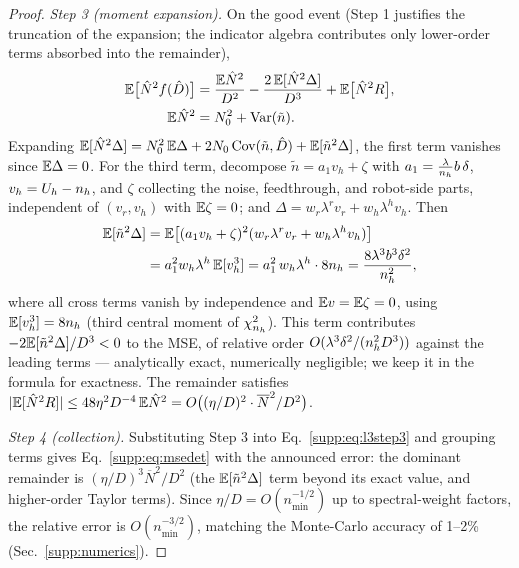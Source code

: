 \begin{proof}
\emph{Step 3 (moment expansion).}
On the good event (Step 1 justifies the truncation of the expansion; the indicator algebra contributes only lower-order terms absorbed into the remainder),
\begin{equation}
\begin{aligned}
  \mathbb{E}\big[\hat N^2 f(\hat D)\big] &= \frac{\mathbb{E}\hat N^2}{D^2} - \frac{2\,\mathbb{E}[\hat N^2 \Delta]}{D^3} + \mathbb{E}\big[\hat N^2 R\big],\\
  \mathbb{E}\hat N^2 &= N_0^2 + \mathrm{Var}(\tilde n).
\end{aligned}
  \label{supp:eq:l3step3}
\end{equation}
Expanding $\mathbb{E}[\hat N^2\Delta] = N_0^2\,\mathbb{E}\Delta + 2N_0\,\mathrm{Cov}(\tilde n, \hat D) + \mathbb{E}[\tilde n^2\Delta]$, the first term vanishes since $\mathbb{E}\Delta = 0$.
For the third term, decompose $\tilde n = a_1 v_h + \zeta$ with $a_1 = \frac{\lambda}{n_h} b\,\delta$, $v_h = U_h - n_h$, and $\zeta$ collecting the noise, feedthrough, and robot-side parts, independent of $(v_r, v_h)$ with $\mathbb{E}\zeta = 0$; and $\Delta = w_r \lambda^r v_r + w_h \lambda^h v_h$.
Then
\begin{align}
  \mathbb{E}[\tilde n^2 \Delta]
  &= \mathbb{E}\big[(a_1 v_h + \zeta)^2 (w_r \lambda^r v_r + w_h \lambda^h v_h)\big] \nonumber\\
  &= a_1^2 w_h \lambda^h\, \mathbb{E}[v_h^3]
   = a_1^2\, w_h \lambda^h \cdot 8n_h
   = \frac{8\lambda^3 b^3 \delta^2}{n_h^2},
  \label{supp:eq:third}
\end{align}
where all cross terms vanish by independence and $\mathbb{E} v = \mathbb{E}\zeta = 0$, using $\mathbb{E}[v_h^3] = 8n_h$ (third central moment of $\chi^2_{n_h}$).
This term contributes $-2\mathbb{E}[\tilde n^2\Delta]/D^3 < 0$ to the MSE, of relative order $O(\lambda^3\delta^2/(n_h^2 D^3))$ against the leading terms --- analytically exact, numerically negligible; we keep it in the formula for exactness.
The remainder satisfies $|\mathbb{E}[\hat N^2 R]| \le 48\eta^2 D^{-4}\, \mathbb{E}\hat N^2 = O\big((\eta/D)^2 \cdot \overline{N}^2/D^2\big)$.

\emph{Step 4 (collection).}
Substituting Step 3 into Eq.~\eqref{supp:eq:l3step3} and grouping terms gives Eq.~\eqref{supp:eq:msedet} with the announced error: the dominant remainder is $(\eta/D)^3 \overline{N}^2/D^2$ (the $\mathbb{E}[\tilde n^2\Delta]$ term beyond its exact value, and higher-order Taylor terms).
Since $\eta/D = O(n_{\min}^{-1/2})$ up to spectral-weight factors, the relative error is $O(n_{\min}^{-3/2})$, matching the Monte-Carlo accuracy of 1--2\% (Sec.~\ref{supp:numerics}).
\end{proof}

